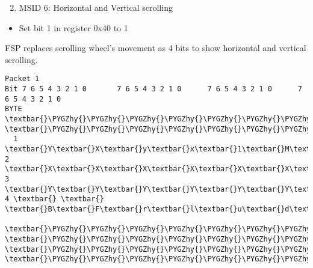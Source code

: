 \documentclass[a4paper,8pt,english]{sphinxmanual}
\def\PYGZhy{\char`\-}
\begin{document}
\begin{enumerate}
\setcounter{enumi}{1}
\item {} 
MSID 6: Horizontal and Vertical scrolling

\end{enumerate}
\begin{itemize}
\item {} 
Set bit 1 in register 0x40 to 1

\end{itemize}

FSP replaces scrolling wheel's movement as 4 bits to show horizontal and
vertical scrolling.

\begin{Verbatim}[commandchars=\\\{\}]
Packet 1
Bit 7 6 5 4 3 2 1 0       7 6 5 4 3 2 1 0      7 6 5 4 3 2 1 0      7 6 5 4 3 2 1 0
BYTE  \textbar{}\PYGZhy{}\PYGZhy{}\PYGZhy{}\PYGZhy{}\PYGZhy{}\PYGZhy{}\PYGZhy{}\PYGZhy{}\PYGZhy{}\PYGZhy{}\PYGZhy{}\PYGZhy{}\PYGZhy{}\PYGZhy{}\PYGZhy{}\textbar{}BYTE \textbar{}\PYGZhy{}\PYGZhy{}\PYGZhy{}\PYGZhy{}\PYGZhy{}\PYGZhy{}\PYGZhy{}\PYGZhy{}\PYGZhy{}\PYGZhy{}\PYGZhy{}\PYGZhy{}\PYGZhy{}\PYGZhy{}\PYGZhy{}\textbar{}BYTE\textbar{}\PYGZhy{}\PYGZhy{}\PYGZhy{}\PYGZhy{}\PYGZhy{}\PYGZhy{}\PYGZhy{}\PYGZhy{}\PYGZhy{}\PYGZhy{}\PYGZhy{}\PYGZhy{}\PYGZhy{}\PYGZhy{}\PYGZhy{}\textbar{}BYTE\textbar{}\PYGZhy{}\PYGZhy{}\PYGZhy{}\PYGZhy{}\PYGZhy{}\PYGZhy{}\PYGZhy{}\PYGZhy{}\PYGZhy{}\PYGZhy{}\PYGZhy{}\PYGZhy{}\PYGZhy{}\PYGZhy{}\PYGZhy{}\textbar{}
  1   \textbar{}Y\textbar{}X\textbar{}y\textbar{}x\textbar{}1\textbar{}M\textbar{}R\textbar{}L\textbar{}  2  \textbar{}X\textbar{}X\textbar{}X\textbar{}X\textbar{}X\textbar{}X\textbar{}X\textbar{}X\textbar{}  3 \textbar{}Y\textbar{}Y\textbar{}Y\textbar{}Y\textbar{}Y\textbar{}Y\textbar{}Y\textbar{}Y\textbar{}  4 \textbar{} \textbar{} \textbar{}B\textbar{}F\textbar{}r\textbar{}l\textbar{}u\textbar{}d\textbar{}
      \textbar{}\PYGZhy{}\PYGZhy{}\PYGZhy{}\PYGZhy{}\PYGZhy{}\PYGZhy{}\PYGZhy{}\PYGZhy{}\PYGZhy{}\PYGZhy{}\PYGZhy{}\PYGZhy{}\PYGZhy{}\PYGZhy{}\PYGZhy{}\textbar{}     \textbar{}\PYGZhy{}\PYGZhy{}\PYGZhy{}\PYGZhy{}\PYGZhy{}\PYGZhy{}\PYGZhy{}\PYGZhy{}\PYGZhy{}\PYGZhy{}\PYGZhy{}\PYGZhy{}\PYGZhy{}\PYGZhy{}\PYGZhy{}\textbar{}    \textbar{}\PYGZhy{}\PYGZhy{}\PYGZhy{}\PYGZhy{}\PYGZhy{}\PYGZhy{}\PYGZhy{}\PYGZhy{}\PYGZhy{}\PYGZhy{}\PYGZhy{}\PYGZhy{}\PYGZhy{}\PYGZhy{}\PYGZhy{}\textbar{}    \textbar{}\PYGZhy{}\PYGZhy{}\PYGZhy{}\PYGZhy{}\PYGZhy{}\PYGZhy{}\PYGZhy{}\PYGZhy{}\PYGZhy{}\PYGZhy{}\PYGZhy{}\PYGZhy{}\PYGZhy{}\PYGZhy{}\PYGZhy{}\textbar{}


\end{Verbatim}
\end{document}
